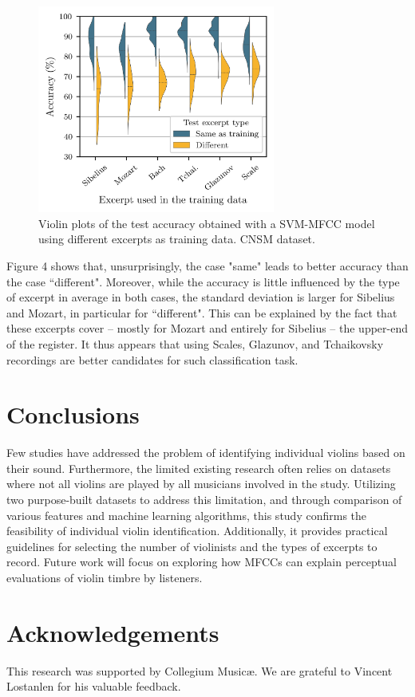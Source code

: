 \documentclass[11pt]{article}
\begin{document}
 \begin{figure}[!ht]
  \centerline{
    \includegraphics[width=7.8cm]{figures/accuracy-vs-excerpt.png}}
  \caption{Violin plots of the test accuracy obtained with a SVM-MFCC model using different excerpts as training data. CNSM dataset.}
  \label{fig:influence_excerpts}
 \end{figure}

\noindent Figure 4 shows that, unsurprisingly, the case "same" leads to better accuracy than the case ``different". Moreover, while the accuracy is little influenced by the type of excerpt in average in both cases, the standard deviation is larger for Sibelius and Mozart, in particular for ``different". This can be explained by the fact  that these excerpts cover -- mostly for Mozart and entirely for Sibelius -- the upper-end of the register. It thus appears that using Scales, Glazunov, and Tchaikovsky recordings are better candidates for such classification task.

\section{Conclusions}\label{sec:conclusions}
Few studies have addressed the problem of identifying individual violins based on their sound. Furthermore, the limited existing research often relies on datasets where not all violins are played by all musicians involved in the study.
Utilizing two purpose-built datasets to address this limitation, and through comparison of various features and machine learning algorithms, this study confirms the feasibility of individual violin identification. Additionally, it provides practical guidelines for selecting the number of violinists and the types of excerpts to record.
Future work will focus on exploring how MFCCs can explain perceptual evaluations of violin timbre by listeners.

\section{Acknowledgements}
This research was supported by Collegium Musicæ. We are grateful to Vincent Lostanlen for his valuable feedback.


\end{document}
